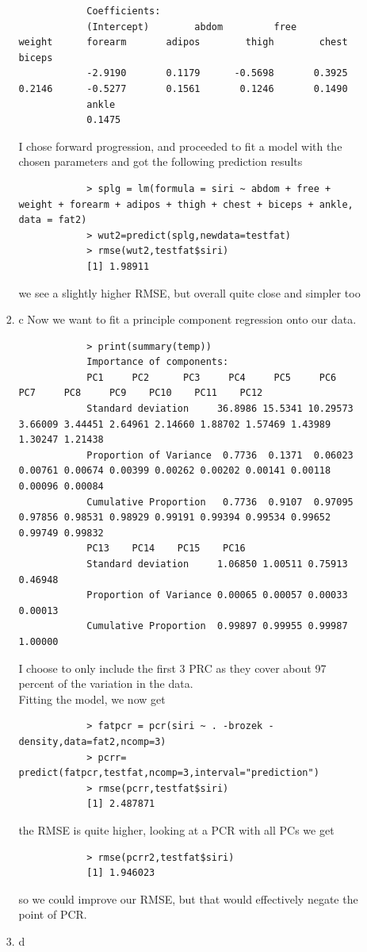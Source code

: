 \documentclass[11pt]{article}
\begin{document}
\begin{enumerate}
\begin{enumerate}
\begin{enumerate}
\begin{verbatim}
			Coefficients:
			(Intercept)        abdom         free       weight      forearm       adipos        thigh        chest       biceps  
			-2.9190       0.1179      -0.5698       0.3925       0.2146      -0.5277       0.1561       0.1246       0.1490  
			ankle  
			0.1475  
		\end{verbatim}
		I chose forward progression, and proceeded to fit a model with the chosen parameters and got the following prediction results
		\begin{verbatim}
			> splg = lm(formula = siri ~ abdom + free + weight + forearm + adipos + thigh + chest + biceps + ankle, data = fat2)
			> wut2=predict(splg,newdata=testfat)
			> rmse(wut2,testfat$siri)
			[1] 1.98911
		\end{verbatim}
		we see a slightly higher RMSE, but overall quite close and simpler too
		\item c
		Now we want to fit a principle component regression onto our data.
		\begin{verbatim}
			> print(summary(temp))
			Importance of components:
			PC1     PC2      PC3     PC4     PC5     PC6     PC7     PC8     PC9    PC10    PC11    PC12
			Standard deviation     36.8986 15.5341 10.29573 3.66009 3.44451 2.64961 2.14660 1.88702 1.57469 1.43989 1.30247 1.21438
			Proportion of Variance  0.7736  0.1371  0.06023 0.00761 0.00674 0.00399 0.00262 0.00202 0.00141 0.00118 0.00096 0.00084
			Cumulative Proportion   0.7736  0.9107  0.97095 0.97856 0.98531 0.98929 0.99191 0.99394 0.99534 0.99652 0.99749 0.99832
			PC13    PC14    PC15    PC16
			Standard deviation     1.06850 1.00511 0.75913 0.46948
			Proportion of Variance 0.00065 0.00057 0.00033 0.00013
			Cumulative Proportion  0.99897 0.99955 0.99987 1.00000
		\end{verbatim}
		I choose to only include the first 3 PRC as they cover about 97 percent of the variation in the data.\\
		Fitting the model, we now get
		\begin{verbatim}
			> fatpcr = pcr(siri ~ . -brozek -density,data=fat2,ncomp=3)
			> pcrr= predict(fatpcr,testfat,ncomp=3,interval="prediction")
			> rmse(pcrr,testfat$siri)
			[1] 2.487871
		\end{verbatim}
		the RMSE is quite higher, looking at a PCR with all PCs we get
		\begin{verbatim}
			> rmse(pcrr2,testfat$siri)
			[1] 1.946023
		\end{verbatim}
		so we could improve our RMSE, but that would effectively negate the point of PCR.
		\item d

\end{enumerate}
\end{enumerate}
\end{enumerate}
\end{document}
